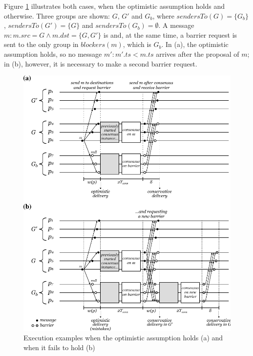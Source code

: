 \documentclass[times, 10pt]{article}
\begin{document}
Figure \ref{fig:optdel} illustrates both cases, when the optimistic assumption holds and otherwise. Three groups are shown: $G$, $G'$ and $G_b$, where $sendersTo(G) = \{G_b\}$, $sendersTo(G') = \{G\}$ and \mbox{$sendersTo(G_b) = \emptyset$}. A message $m : m.src = G \wedge m.dst = \{G, G'\}$ is \cms{} and, at the same time, a barrier request is sent to the only group in $blockers(m)$, which is $G_b$. In (a), the optimistic assumption holds, so no message $m' : m'.ts < m.ts$ arrives after the proposal of $m$; in (b), however, it is necessary to make a second barrier request.

\begin{figure} 
  \centering
  \includegraphics[width=0.8\linewidth]{images/optdel}
  \caption{Execution examples when the optimistic assumption holds (a) and when it fails to hold (b)}
  \label{fig:optdel}
\end{figure}
\end{document}

